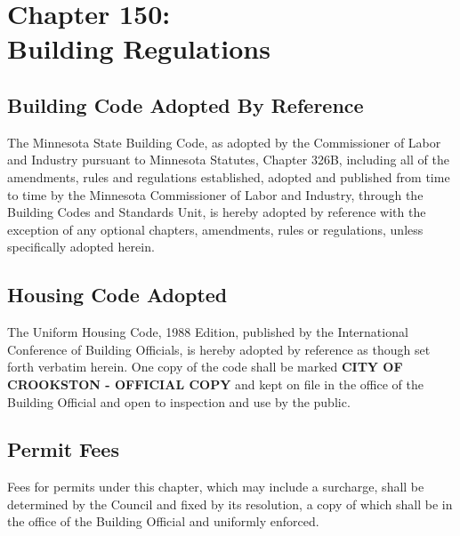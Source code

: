 \chapter*{Chapter 150: \\
	Building Regulations}
    \vfill
    \minitoc
    \pagebreak

\section{Building Code Adopted By Reference}
The Minnesota State Building Code, as adopted by the Commissioner of Labor and Industry pursuant to Minnesota Statutes, Chapter 326B, including all of the amendments, rules and regulations established, adopted and published from time to time by the Minnesota Commissioner of Labor and Industry, through the Building Codes and Standards Unit, is hereby adopted by reference with the exception of any optional chapters, amendments, rules or regulations, unless specifically adopted herein. 

\section{Housing Code Adopted}
The Uniform Housing Code, 1988 Edition, published by the International Conference of Building Officials, is hereby adopted by reference as though set forth verbatim herein.  One copy of the code shall be marked \textbf{CITY OF CROOKSTON - OFFICIAL COPY} and kept on file in the office of the Building Official and open to inspection and use by the public.

\section{Permit Fees}
Fees for permits under this chapter, which may include a surcharge, shall be determined by the Council and fixed by its resolution, a copy of which shall be in the office of the Building Official and uniformly enforced.

